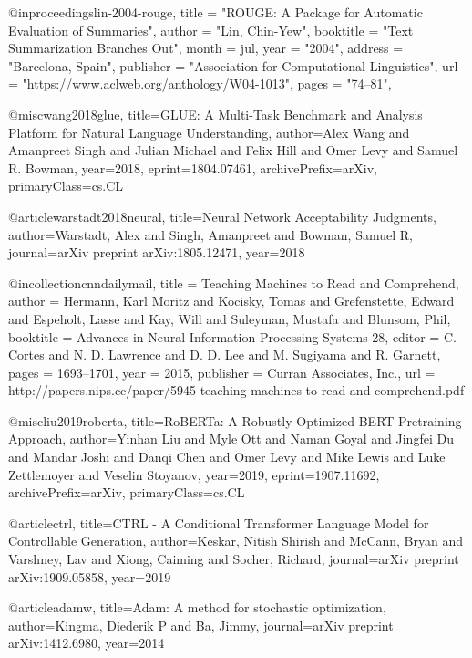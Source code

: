 @inproceedings{lin-2004-rouge,
    title = "{ROUGE}: A Package for Automatic Evaluation of Summaries",
    author = "Lin, Chin-Yew",
    booktitle = "Text Summarization Branches Out",
    month = jul,
    year = "2004",
    address = "Barcelona, Spain",
    publisher = "Association for Computational Linguistics",
    url = "https://www.aclweb.org/anthology/W04-1013",
    pages = "74--81",
}

@misc{wang2018glue,
    title={GLUE: A Multi-Task Benchmark and Analysis Platform for Natural Language Understanding},
    author={Alex Wang and Amanpreet Singh and Julian Michael and Felix Hill and Omer Levy and Samuel R. Bowman},
    year={2018},
    eprint={1804.07461},
    archivePrefix={arXiv},
    primaryClass={cs.CL}
}


@article{warstadt2018neural,
    title={Neural Network Acceptability Judgments},
    author={Warstadt, Alex and Singh, Amanpreet and Bowman, Samuel R},
    journal={arXiv preprint arXiv:1805.12471},
    year={2018}
}

@incollection{cnndailymail,
title = {Teaching Machines to Read and Comprehend},
author = {Hermann, Karl Moritz and Kocisky, Tomas and Grefenstette, Edward and Espeholt, Lasse and Kay, Will and Suleyman, Mustafa and Blunsom, Phil},
booktitle = {Advances in Neural Information Processing Systems 28},
editor = {C. Cortes and N. D. Lawrence and D. D. Lee and M. Sugiyama and R. Garnett},
pages = {1693--1701},
year = {2015},
publisher = {Curran Associates, Inc.},
url = {http://papers.nips.cc/paper/5945-teaching-machines-to-read-and-comprehend.pdf}
}

@misc{liu2019roberta,
    title={RoBERTa: A Robustly Optimized BERT Pretraining Approach},
    author={Yinhan Liu and Myle Ott and Naman Goyal and Jingfei Du and Mandar Joshi and Danqi Chen and Omer Levy and Mike Lewis and Luke Zettlemoyer and Veselin Stoyanov},
    year={2019},
    eprint={1907.11692},
    archivePrefix={arXiv},
    primaryClass={cs.CL}
}

@article{ctrl,
  title={{CTRL - A Conditional Transformer Language Model for Controllable Generation}},
  author={Keskar, Nitish Shirish and McCann, Bryan and Varshney, Lav and Xiong, Caiming and Socher, Richard},
  journal={arXiv preprint arXiv:1909.05858},
  year={2019}
}

@article{adamw,
  title={Adam: A method for stochastic optimization},
  author={Kingma, Diederik P and Ba, Jimmy},
  journal={arXiv preprint arXiv:1412.6980},
  year={2014}
}